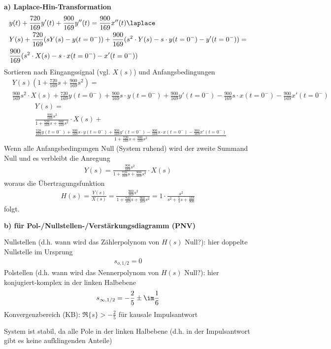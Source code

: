 \begin{ExCalc}
\textbf{a) Laplace-Hin-Transformation}
\begin{align}
&y(t) + \frac{720}{169} y'(t) + \frac{900}{169} y''(t) = \frac{900}{169} x''(t) \laplace\\
&Y(s) + \frac{720}{169} (s Y(s) - y(t=0^-)) + \frac{900}{169} (s^2 \cdot Y(s) - s \cdot y(t=0^-) - y'(t=0^-)) =\nonumber\\
&\frac{900}{169} (s^2 \cdot X(s) - s \cdot x(t=0^-) - x'(t=0^-))
\end{align}
Sortieren nach Eingangssignal (vgl. $X(s)$) und Anfangsbedingungen
\begin{align}
&Y(s) (1 + \frac{720}{169} s + \frac{900}{169} s^2) = \nonumber\\
&\frac{900}{169} s^2 \cdot X(s) + \frac{720}{169} y(t=0^-) + \frac{900}{169} s \cdot y(t=0^-) + \frac{900}{169} y'(t=0^-) - \frac{900}{169} s \cdot x(t=0^-) - \frac{900}{169} x'(t=0^-)
\end{align}
%
\begin{align}
&Y(s) = \nonumber\\
&\frac{\frac{900}{169} s^2}{1 + \frac{720}{169} s + \frac{900}{169} s^2}
\cdot X(s) +\nonumber\\
&\frac{\frac{720}{169} y(t=0^-) + \frac{900}{169} s \cdot y(t=0^-) + \frac{900}{169} y'(t=0^-) - \frac{900}{169} s \cdot x(t=0^-) - \frac{900}{169} x'(t=0^-)}{1 + \frac{720}{169} s + \frac{900}{169} s^2}
\end{align}
Wenn alle Anfangsbedingungen Null (System ruhend) wird der zweite Summand Null und es verbleibt die Anregung
\begin{align}
Y(s) = \frac{\frac{900}{169} s^2}{1 + \frac{720}{169} s + \frac{900}{169} s^2} \cdot X(s)
\end{align}
woraus die Übertragungsfunktion
\begin{align}
H(s) = \frac{Y(s)}{X(s)} = \frac{\frac{900}{169} s^2}{1 + \frac{720}{169} s + \frac{900}{169} s^2}
= 1 \cdot \frac{s^2}{s^2 + \frac{5}{4} s + \frac{169}{900}}
\end{align}
folgt.

\noindent \textbf{b) für Pol-/Nullstellen-/Verstärkungsdiagramm (PNV)}

Nullstellen (d.h. wann wird das Zählerpolynom von $H(s)$ Null?): hier doppelte Nullstelle im Ursprung
\begin{align}
s_{o,1/2} = 0
\end{align}
Polstellen (d.h. wann wird das Nennerpolynom von $H(s)$ Null?): hier konjugiert-komplex in der linken Halbebene
\begin{align}
s_{\infty,1/2} = -\frac{2}{5} \pm \im \frac{1}{6}
\end{align}
Konvergenzbereich (KB): $\Re\{s\}>-\frac{2}{5}$ für kausale Impulsantwort

System ist stabil, da alle Pole in der linken Halbebene (d.h. in der Impulsantwort gibt es keine aufklingenden Anteile)

\end{ExCalc}

